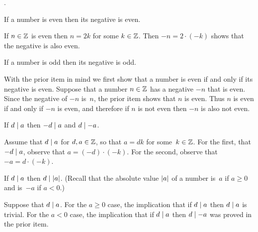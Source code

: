 \documentclass{test}  %
\begin{document}
\begin{problem}  
\label{ex:InteractionOfParityWithSign}
\pord.
\begin{exes}
  \begin{exercise}
    If a number is even then its negative is even.
  \end{exercise}
  \begin{answer}
    If $n\in\mathbb{Z}$ is even then $n=2k$ for some $k\in\mathbb{Z}$.
    Then $-n=2\cdot(-k)$ shows that the negative is also even.  
  \end{answer}
  \begin{exercise}
    If a number is odd then its negative is odd.
  \end{exercise}
  \begin{answer}
    With the prior item in mind we first show that a number is even
    if and only if its negative is even.
    Suppose that a number $n\in\mathbb{Z}$ has a negative $-n$ that is even.
    Since the negative of $-n$ is~$n$, the prior item shows that $n$ is even.
    Thus $n$ is even if and only if $-n$ is even, and therefore
    if $n$ is not even then $-n$ is also not even.
  \end{answer}
  \begin{exercise}
    If $d\mid a$ then $-d\mid a$ and $d\mid -a$.
  \end{exercise}
  \begin{answer}
    Assume that $d\mid a$ for $d,a\in\mathbb{Z}$, so that 
    $a=dk$ for some~$k\in\mathbb{Z}$.
    For the first, that $-d\mid a$, observe that
    $a=(-d)\cdot(-k)$.
    For the second, observe that $-a=d\cdot(-k)$.
  \end{answer}
  \begin{exercise}
    If $d\mid a$ then $d\mid\lvert a\rvert$.
    (Recall that the absolute value  $\lvert a\rvert$ of a number is~$a$ 
    if $a\geq 0$ and is~$-a$ if $a<0$.)
  \end{exercise}
  \begin{answer}
    Suppose that $d\mid a$.
    For the $a\geq 0$ case, the implication that if $d\mid a$ then 
    $d\mid a$ is trivial.
    For the $a<0$ case, 
    the implication that if $d\mid a$ then $d\mid -a$ was
    proved in the prior item.    
  \end{answer}
\end{exes}  
\end{problem}

\end{document}
